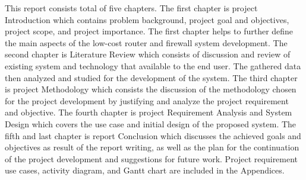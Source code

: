 \documentclass[../index.tex]{subfiles}
\begin{document}
This report consists total of five chapters. The first chapter is project Introduction which contains problem background, project goal and objectives, project scope, and project importance. The first chapter helps to further define the main aspects of the low-cost router and firewall system development. The second chapter is Literature Review which consists of discussion and review of existing system and technology that available to the end user. The gathered data then analyzed and studied for the development of the system. The third chapter is project Methodology which consists the discussion of the methodology chosen for the project development by justifying and analyze the project requirement and objective. The fourth chapter is project Requirement Analysis and System Design which covers the use case and initial design of the proposed system. The fifth and last chapter is report Conclusion which discusses the achieved goals and objectives as result of the report writing, as well as the plan for the continuation of the project development and suggestions for future work. Project requirement use cases, activity diagram, and Gantt chart are included in the Appendices.
\end{document}
